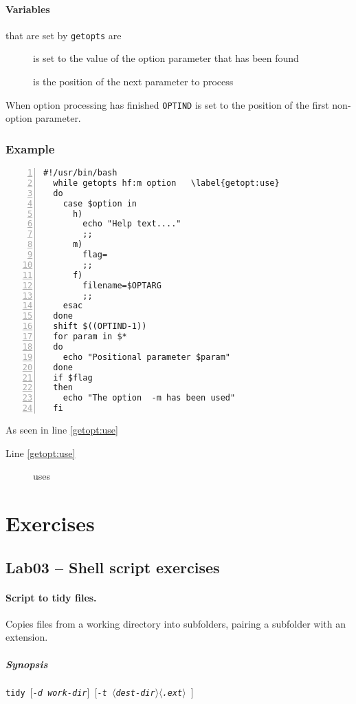 \documentclass{article}
\newcommand{\required}[1]{$\langle$\itshape #1$\rangle$}
\newcommand{\optional}[1]{$[$\itshape #1$]$}
\begin{document}
\paragraph{Variables} that are set by \texttt{getopts} are
\begin{description}
  \item[] is set to the value of the option parameter that has been found
\item[] is the position of the next parameter to process
\end{description}
When option processing has finished \texttt{OPTIND} is set to the position of the first non-option parameter.

\subsubsection{Example}
\begin{Verbatim}[numbers=left,gobble=2,commandchars=\\\{\}]
  #!/usr/bin/bash
  while getopts hf:m option   \label{getopt:use}
  do
    case $option in
      h)
        echo "Help text...."
        ;;
      m)
        flag=
        ;;
      f)
        filename=$OPTARG
        ;;
    esac
  done
  shift $((OPTIND-1))
  for param in $*
  do
    echo "Positional parameter $param"
  done
  if $flag
  then
    echo "The option  -m has been used"
  fi
\end{Verbatim}

As seen in line \ref{getopt:use}
\begin{description}
  \item[Line \ref{getopt:use}] uses
\end{description}

\section{Exercises}
\subsection{Lab03 -- Shell script exercises}
\paragraph{Script to tidy files.}  Copies files from a working directory into subfolders, pairing a subfolder with an extension.
\subparagraph{Synopsis} \texttt{tidy \optional{-d work-dir} \optional{-t \required{dest-dir}\required{.ext} }}
\end{document}
